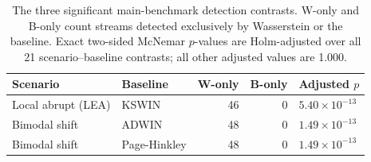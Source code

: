 \documentclass[preprint,12pt]{elsarticle}
\begin{document}
\begin{table}[htbp]\centering\small
\caption{The three significant main-benchmark detection contrasts. W-only and B-only count streams detected exclusively by Wasserstein or the baseline. Exact two-sided McNemar $p$-values are Holm-adjusted over all 21 scenario--baseline contrasts; all other adjusted values are 1.000.}\label{tab:mcnemar}
\setlength{\tabcolsep}{5pt}\begin{tabular}{llrrl}
\toprule
Scenario & Baseline & W-only & B-only & Adjusted $p$\\\midrule
Local abrupt (LEA) & KSWIN & 46 & 0 & $5.40\times10^{-13}$\\
Bimodal shift & ADWIN & 48 & 0 & $1.49\times10^{-13}$\\
Bimodal shift & Page-Hinkley & 48 & 0 & $1.49\times10^{-13}$\\
\bottomrule\end{tabular}\end{table}
\end{document}
